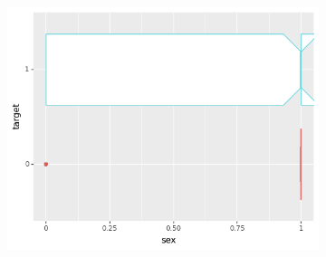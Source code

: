 \begin{figure}[b]
\begin{subfigure}[b]{0.32\textwidth}
         \includegraphics[width=\textwidth]{plots/target-sex}
     \end{subfigure}


\end{figure}
